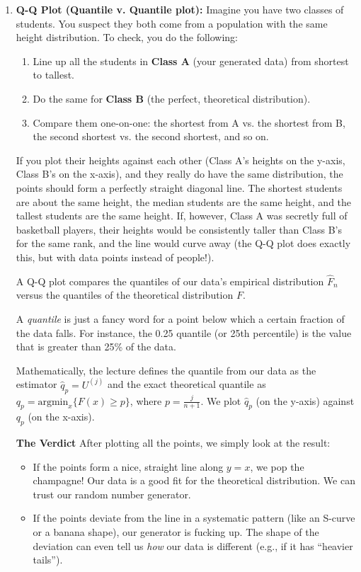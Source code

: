 \begin{enumerate}
    \item \textbf{Q-Q Plot (Quantile v. Quantile plot): } 
    Imagine you have two classes of students. You suspect they both come from a population with the same height distribution. To check, you do the following:
        \begin{enumerate}
            \item Line up all the students in \textbf{Class A} (your generated data) from shortest to tallest.
            \item Do the same for \textbf{Class B} (the perfect, theoretical distribution).
            \item Compare them one-on-one: the shortest from A vs. the shortest from B, the second shortest vs. the second shortest, and so on.
        \end{enumerate}

        If you plot their heights against each other (Class A's heights on the y-axis, Class B's on the x-axis), and they really do have the same distribution, the points should form a perfectly straight diagonal line. The shortest students are about the same height, the median students are the same height, and the tallest students are the same height. 
        If, however, Class A was secretly full of basketball players, their heights would be consistently taller than Class B's for the same rank, and the line would curve away (the Q-Q plot does exactly this, but with data points instead of people!).

        \vspace{0.2cm}

        A Q-Q plot compares the quantiles of our data's empirical distribution $\hat{F}_n$ versus the quantiles of the theoretical distribution $F$. \begin{definition} A \textit{quantile} is just a fancy word for a point below which a certain fraction of the data falls. For instance, the 0.25 quantile (or 25th percentile) 
        is the value that is greater than 25\% of the data. 

        Mathematically, the lecture defines the quantile from our data as the estimator $\hat{q}_p = U^{(j)}$ and the exact theoretical quantile as $q_p = \text{argmin}_x \{F(x) \ge p\}$, where $p=\frac{j}{n+1}$. We plot $\hat{q}_p$ (on the y-axis) against $q_p$ (on the x-axis). \end{definition}

        \textbf{The Verdict}
        After plotting all the points, we simply look at the result:
        \begin{itemize}
            \item If the points form a nice, straight line along $y=x$, we pop the champagne! Our data is a good fit for the theoretical distribution. We can trust our random number generator.
            \item If the points deviate from the line in a systematic pattern (like an S-curve or a banana shape), our generator is fucking up. The shape of the deviation can even tell us \textit{how} our data is different (e.g., if it has ``heavier tails'').
        \end{itemize}


\end{enumerate}
